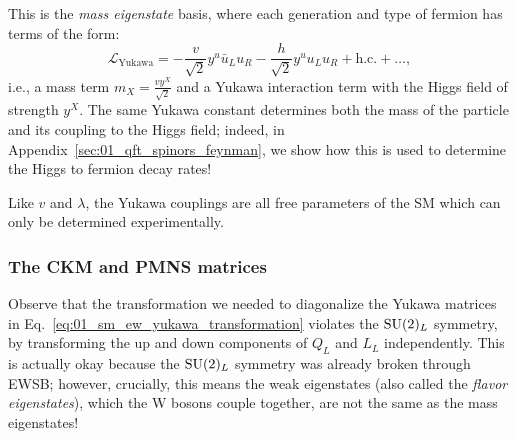 This is the \textit{mass eigenstate} basis, where each generation and type of fermion has terms of the form:
\begin{equation}
	\label{eq:01_sm_ew_yukawa_mass}
	\mathcal{L}_{\mathrm{Yukawa}} = -\frac{v}{\sqrt{2}} y^u \bar u_L u_R - \frac{h}{\sqrt{2}} y^u u_L u_R + \text{h.c.} + \ldots,
\end{equation}
i.e., a mass term $m_X = \frac{v y^X}{\sqrt{2}}$ and a Yukawa interaction term with the Higgs field of strength $y^X$.
The same Yukawa constant determines both the mass of the particle and its coupling to the Higgs field;
indeed, in Appendix~\ref{sec:01_qft_spinors_feynman}, we show how this is used to determine the Higgs to fermion decay rates!

Like $v$ and $\lambda$, the Yukawa couplings are all free parameters of the SM which can only be determined experimentally.

\subsubsection{The CKM and PMNS matrices}

Observe that the transformation we needed to diagonalize the Yukawa matrices in Eq.~\ref{eq:01_sm_ew_yukawa_transformation} violates the $\SU[2]_L$ symmetry, by transforming the up and down components of $Q_L$ and $L_L$ independently.
This is actually okay because the $\SU[2]_L$ symmetry was already broken through EWSB; however, crucially, this means the weak eigenstates (also called the \textit{flavor eigenstates}), which the W bosons couple together, are not the same as the mass eigenstates!

